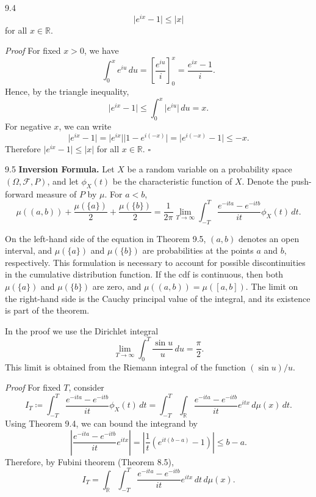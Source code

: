\begin{thmbox}{9.4}
\[
\lvert e^{ix}-1\rvert\leq \lvert x\rvert
\]
for all $x\in\mathbb{R}$.
\end{thmbox}

\textit{Proof}
For fixed $x>0$, we have
\[
\int_0^x e^{iu}\,du
=\left[\frac{e^{iu}}{i}\right]_0^x
=\frac{e^{ix}-1}{i}.
\]
Hence, by the triangle inequality,
\[
\lvert e^{ix}-1\rvert\leq \int_0^x \lvert e^{iu}\rvert\,du=x.
\]
For negative $x$, we can write
\[
\lvert e^{ix}-1\rvert
=\lvert e^{ix}\rvert\lvert 1-e^{i(-x)}\rvert
=\lvert e^{i(-x)}-1\rvert
\leq -x.
\]
Therefore $\lvert e^{ix}-1\rvert\leq \lvert x\rvert$ for all $x\in\mathbb{R}$.
\hfill $\square$

\begin{thmbox}{9.5}
\textbf{Inversion Formula.}
Let $X$ be a random variable on a probability space $(\Omega,\mathcal{F},P)$, and let $\phi_X(t)$ be the characteristic function of $X$. Denote the push-forward measure of $P$ by $\mu$. For $a<b$,
\[
\mu((a,b))+\frac{\mu(\{a\})}{2}+\frac{\mu(\{b\})}{2}
=\frac{1}{2\pi}\lim_{T\to\infty}
\int_{-T}^{T}\frac{e^{-ita}-e^{-itb}}{it}\phi_X(t)\,dt.
\]
\end{thmbox}

On the left-hand side of the equation in Theorem 9.5, $(a,b)$ denotes an open interval, and $\mu(\{a\})$ and $\mu(\{b\})$ are probabilities at the points $a$ and $b$, respectively. This formulation is necessary to account for possible discontinuities in the cumulative distribution function. If the cdf is continuous, then both $\mu(\{a\})$ and $\mu(\{b\})$ are zero, and $\mu((a,b))=\mu([a,b])$. The limit on the right-hand side is the Cauchy principal value of the integral, and its existence is part of the theorem.

In the proof we use the Dirichlet integral
\[
\lim_{T\to\infty}\int_0^T \frac{\sin u}{u}\,du=\frac{\pi}{2}.
\]
This limit is obtained from the Riemann integral of the function $(\sin u)/u$.

\textit{Proof}
For fixed $T$, consider
\[
I_T \coloneqq
\int_{-T}^{T}\frac{e^{-ita}-e^{-itb}}{it}\phi_X(t)\,dt
=\int_{-T}^{T}\int_{\mathbb{R}}
\frac{e^{-ita}-e^{-itb}}{it}e^{itx}\,d\mu(x)\,dt.
\]
Using Theorem 9.4, we can bound the integrand by
\[
\left\lvert
\frac{e^{-ita}-e^{-itb}}{it}e^{itx}
\right\rvert
=\left\lvert \frac{1}{t}(e^{it(b-a)}-1)\right\rvert
\leq b-a.
\]
Therefore, by Fubini theorem (Theorem 8.5),
\[
I_T=\int_{\mathbb{R}}\int_{-T}^{T}
\frac{e^{-ita}-e^{-itb}}{it}e^{itx}\,dt\,d\mu(x).
\tag{9.1}
\]

